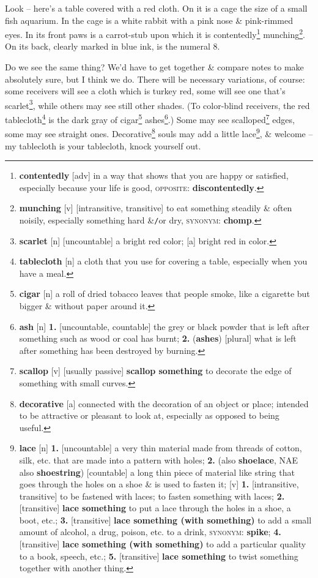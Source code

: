 \documentclass[oneside]{book}
\numberwithin{equation}{section}
\begin{document}
Look -- here's a table covered with a red cloth. On it is a cage the size of a small fish aquarium. In the cage is a white rabbit with a pink nose \& pink-rimmed eyes. In its front paws is a carrot-stub upon which it is contentedly\footnote{\textbf{contentedly} [adv] in a way that shows that you are happy or satisfied, especially because your life is good, \textsc{opposite}: \textbf{discontentedly}.} munching\footnote{\textbf{munching} [v] [intransitive, transitive] to eat something steadily \& often noisily, especially something hard \&\texttt{/}or dry, \textsc{synonym}: \textbf{chomp}.}. On its back, clearly marked in blue ink, is the numeral 8.

Do we see the same thing? We'd have to get together \& compare notes to make absolutely sure, but I think we do. There will be necessary variations, of course: some receivers will see a cloth which is turkey red, some will see one that's scarlet\footnote{\textbf{scarlet} [n] [uncountable] a bright red color; [a] bright red in color.}, while others may see still other shades. (To color-blind receivers, the red tablecloth\footnote{\textbf{tablecloth} [n] a cloth that you use for covering a table, especially when you have a meal.} is the dark gray of cigar\footnote{\textbf{cigar} [n] a roll of dried tobacco leaves that people smoke, like a cigarette but bigger \& without paper around it.} ashes\footnote{\textbf{ash} [n] \textbf{1.} [uncountable, countable] the grey or black powder that is left after something such as wood or coal has burnt; \textbf{2.} (\textbf{ashes}) [plural] what is left after something has been destroyed by burning.}.) Some may see scalloped\footnote{\textbf{scallop} [v] [usually passive] \textbf{scallop something} to decorate the edge of something with small curves.} edges, some may see straight ones. Decorative\footnote{\textbf{decorative} [a] connected with the decoration of an object or place; intended to be attractive or pleasant to look at, especially as opposed to being useful.} souls may add a little lace\footnote{\textbf{lace} [n] \textbf{1.} [uncountable] a very thin material made from threads of cotton, silk, etc. that are made into a pattern with holes; \textbf{2.} (also \textbf{shoelace}, NAE also \textbf{shoestring}) [countable] a long thin piece of material like string that goes through the holes on a shoe \& is used to fasten it; [v] \textbf{1.} [intransitive, transitive] to be fastened with laces; to fasten something with laces; \textbf{2.} [transitive] \textbf{lace something} to put a lace through the holes in a shoe, a boot, etc.; \textbf{3.} [transitive] \textbf{lace something (with something)} to add a small amount of alcohol, a drug, poison, etc. to a drink, \textsc{synonym}: \textbf{spike}; \textbf{4.} [transitive] \textbf{lace something (with something)} to add a particular quality to a book, speech, etc.; \textbf{5.} [transitive] \textbf{lace something} to twist something together with another thing.}, \& welcome -- my tablecloth is your tablecloth, knock yourself out.
\end{document}
